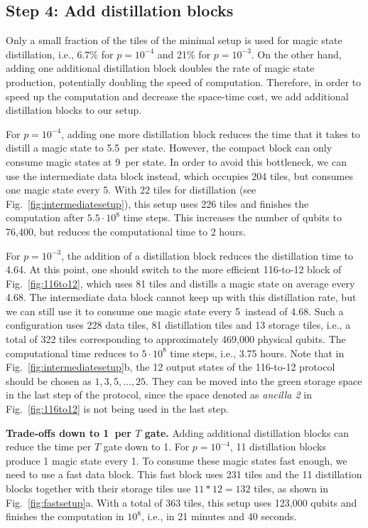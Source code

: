 \documentclass[prx,aps,letterpaper,twocolumn,allowfontchageintitle=true,accepted=2019-02-01]{quantumarticle}
\begin{document}
\subsection{Step 4: Add distillation blocks}

Only a small fraction of the tiles of the minimal setup is used for magic state distillation, i.e., $6.7\%$ for $p=10^{-4}$ and 21\% for $p=10^{-3}$. On the other hand, adding one additional distillation block doubles the rate of magic state production, potentially doubling the speed of computation. Therefore, in order to speed up the computation and decrease the space-time cost, we add additional distillation blocks to our setup.

For $p=10^{-4}$, adding one more distillation block reduces the time that it takes to distill a magic state to 5.5\clock \ per state. However, the compact block can only consume magic states at 9\clock \ per state. In order to avoid this bottleneck, we can use the intermediate data block instead, which occupies 204 tiles, but consumes one magic state every 5\clock. With 22 tiles for distillation (see Fig.~\ref{fig:intermediatesetup}), this setup uses 226 tiles and finishes the computation after $5.5 \cdot 10^8$ time steps. This increases the number of qubits to 76,400, but reduces the computational time to 2 hours.

For $p=10^{-3}$, the addition of a distillation block reduces the distillation time to 4.64\clock. At this point, one should switch to the more efficient 116-to-12 block of Fig.~\ref{fig:116to12}, which uses 81 tiles and distills a magic state on average every 4.68\clock.
The intermediate data block cannot keep up with this distillation rate, but we can still use it to consume one magic state every 5\clock \ instead of 4.68\clock. Such a configuration uses 228 data tiles, 81 distillation tiles and 13 storage tiles, i.e., a total of 322 tiles corresponding to approximately 469,000 physical qubits. The computational time reduces to $5 \cdot 10^8$ time steps, i.e., 3.75 hours. Note that in Fig.~\ref{fig:intermediatesetup}b, the 12 output states of the 116-to-12 protocol should be chosen as $1,3,5,\dots,25$. They can be moved into the green storage space in the last step of the protocol, since the space denoted as \textit{ancilla 2} in Fig.~\ref{fig:116to12} is not being used in the last step.

\textbf{Trade-offs down to 1\clock \ per $T$ gate.}
Adding additional distillation blocks can reduce the time per $T$ gate down to 1\clock. For $p=10^{-4}$, 11 distillation blocks produce 1 magic state every 1\clock. To consume these magic states fast enough, we need to use a fast data block. This fast block uses 231 tiles and the 11 distillation blocks together with their storage tiles use $11*12=132$ tiles, as shown in Fig.~\ref{fig:fastsetup}a. With a total of 363 tiles, this setup uses 123,000 qubits and finishes the computation in $10^8$\clock, i.e., in 21 minutes and 40 seconds.
\end{document}
